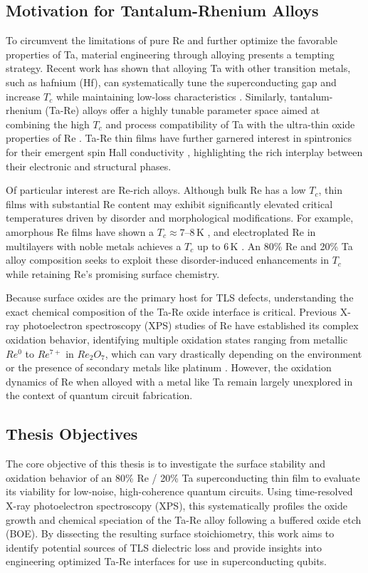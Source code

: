 \documentclass[12pt]{article}
\begin{document}
\subsection{Motivation for Tantalum-Rhenium Alloys}
To circumvent the limitations of pure Re and further optimize the favorable properties of Ta, material engineering through alloying presents a tempting strategy. Recent work has shown that alloying Ta with other transition metals, such as hafnium (Hf), can systematically tune the superconducting gap and increase $T_c$ while maintaining low-loss characteristics \cite{yang2026tantalum}. Similarly, tantalum-rhenium (Ta-Re) alloys offer a highly tunable parameter space aimed at combining the high $T_c$ and process compatibility of Ta with the ultra-thin oxide properties of Re \cite{mamiya1970superconductivity_ta_re}. Ta-Re thin films have further garnered interest in spintronics for their emergent spin Hall conductivity \cite{janus2025}, highlighting the rich interplay between their electronic and structural phases.

Of particular interest are Re-rich alloys. Although bulk Re has a low $T_c$, thin films with substantial Re content may exhibit significantly elevated critical temperatures driven by disorder and morphological modifications. For example, amorphous Re films have shown a $T_c \approx 7$--$8$\,K \cite{tarkaeva2025}, and electroplated Re in multilayers with noble metals achieves a $T_c$ up to 6\,K \cite{pappas2018}. An 80\% Re and 20\% Ta alloy composition seeks to exploit these disorder-induced enhancements in $T_c$ while retaining Re's promising surface chemistry. 

Because surface oxides are the primary host for TLS defects, understanding the exact chemical composition of the Ta-Re oxide interface is critical. Previous X-ray photoelectron spectroscopy (XPS) studies of Re have established its complex oxidation behavior, identifying multiple oxidation states ranging from metallic $Re^0$ to $Re^{7+}$ in $Re_2O_7$, which can vary drastically depending on the environment or the presence of secondary metals like platinum \cite{greiner2014, cimino1980photoelectron, tysoe1988xps}. However, the oxidation dynamics of Re when alloyed with a metal like Ta remain largely unexplored in the context of quantum circuit fabrication.

\subsection{Thesis Objectives}
The core objective of this thesis is to investigate the surface stability and oxidation behavior of an 80\% Re / 20\% Ta superconducting thin film to evaluate its viability for low-noise, high-coherence quantum circuits. Using time-resolved X-ray photoelectron spectroscopy (XPS), this systematically profiles the oxide growth and chemical speciation of the Ta-Re alloy following a buffered oxide etch (BOE). By dissecting the resulting surface stoichiometry, this work aims to identify potential sources of TLS dielectric loss and provide insights into engineering optimized Ta-Re interfaces for use in superconducting qubits.
\end{document}
